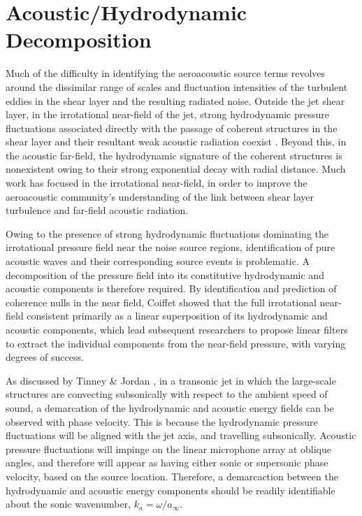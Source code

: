 \section{Acoustic/Hydrodynamic Decomposition}
\label{sect:ac_decomp}
Much of the difficulty in identifying the aeroacoustic source terms revolves around the dissimilar range of scales and fluctuation intensities of the turbulent eddies in the shear layer and the resulting radiated noise. 
Outside the jet shear layer, in the irrotational near-field of the jet, strong hydrodynamic pressure fluctuations associated directly with the passage of coherent structures in the shear layer and their resultant weak acoustic radiation coexist \citep{Arndt1997}. 
Beyond this, in the acoustic far-field, the hydrodynamic signature of the coherent structures is nonexistent owing to their strong exponential decay with radial distance.
Much work has focused in the irrotational near-field, in order to improve the aeroacoustic community's understanding of the link between shear layer turbulence and far-field acoustic radiation. 

Owing to the presence of strong hydrodynamic fluctuations dominating the irrotational pressure field near the noise source regions, identification of pure acoustic waves and their corresponding source events is problematic.
A decomposition of the pressure field into its constitutive hydrodynamic and acoustic components is therefore required. 
By identification and prediction of coherence nulls in the near field, Coiffet \etal \citep{Coiffet2006} showed that the full irrotational near-field consistent primarily as a linear superposition of its hydrodynamic and acoustic components, which lead subsequent researchers to propose linear filters to extract the individual components from the near-field pressure, with varying degrees of success. 

As discussed by Tinney \& Jordan \citep{Tinney2008}, in a transonic jet in which the large-scale structures are convecting subsonically with respect to the ambient speed of sound, a demarcation of the hydrodynamic and acoustic energy fields can be observed with phase velocity.
This is because the hydrodynamic pressure fluctuations will be aligned with the jet axis, and travelling subsonically. 
Acoustic pressure fluctuations will impinge on the linear microphone array at oblique angles, and therefore will appear as having either sonic or supersonic phase velocity, based on the source location. 
Therefore, a demarcaction between the hydrodynamic and acoustic energy components should be readily identifiable about the sonic wavenumber, $k_a = \omega / a_\infty$.

